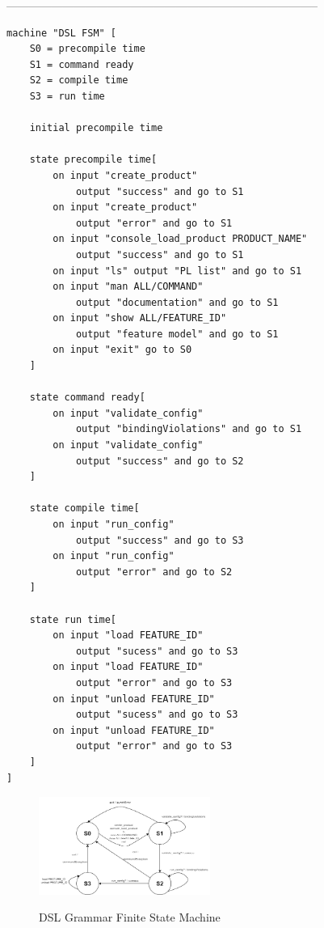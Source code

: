 -----------------------------------------------------------------------------------
\begin{verbatim}
machine "DSL FSM" [
	S0 = precompile time
	S1 = command ready
	S2 = compile time
	S3 = run time
	
	initial precompile time
	
	state precompile time[
	    on input "create_product" 
	        output "success" and go to S1
		on input "create_product" 
		    output "error" and go to S1
		on input "console_load_product PRODUCT_NAME" 
		    output "success" and go to S1
		on input "ls" output "PL list" and go to S1
		on input "man ALL/COMMAND" 
		    output "documentation" and go to S1
		on input "show ALL/FEATURE_ID" 
		    output "feature model" and go to S1
		on input "exit" go to S0
	]
	
	state command ready[
		on input "validate_config" 
		    output "bindingViolations" and go to S1
		on input "validate_config"
		    output "success" and go to S2
	]
	
	state compile time[
		on input "run_config" 
		    output "success" and go to S3
		on input "run_config" 
		    output "error" and go to S2
	]
	
	state run time[
		on input "load FEATURE_ID" 
		    output "sucess" and go to S3
		on input "load FEATURE_ID" 
		    output "error" and go to S3
		on input "unload FEATURE_ID" 
		    output "sucess" and go to S3
		on input "unload FEATURE_ID" 
		    output "error" and go to S3
	]
]
\end{verbatim}

\begin{figure}[H]
\caption{DSL Grammar Finite State Machine}
\centering
\includegraphics[width=0.5\textwidth]{diagrams/fsm.png}
\label{fsm}
\end{figure}

